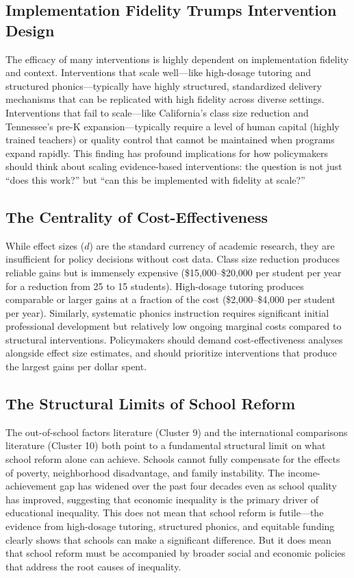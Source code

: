 \documentclass[12pt,letterpaper]{article}
\begin{document}
\subsection{Implementation Fidelity Trumps Intervention Design}

The efficacy of many interventions is highly dependent on implementation fidelity and context. Interventions that scale well---like high-dosage tutoring and structured phonics---typically have highly structured, standardized delivery mechanisms that can be replicated with high fidelity across diverse settings. Interventions that fail to scale---like California's class size reduction and Tennessee's pre-K expansion---typically require a level of human capital (highly trained teachers) or quality control that cannot be maintained when programs expand rapidly. This finding has profound implications for how policymakers should think about scaling evidence-based interventions: the question is not just ``does this work?'' but ``can this be implemented with fidelity at scale?''

\subsection{The Centrality of Cost-Effectiveness}

While effect sizes ($d$) are the standard currency of academic research, they are insufficient for policy decisions without cost data. Class size reduction produces reliable gains but is immensely expensive (\$15,000--\$20,000 per student per year for a reduction from 25 to 15 students). High-dosage tutoring produces comparable or larger gains at a fraction of the cost (\$2,000--\$4,000 per student per year). Similarly, systematic phonics instruction requires significant initial professional development but relatively low ongoing marginal costs compared to structural interventions. Policymakers should demand cost-effectiveness analyses alongside effect size estimates, and should prioritize interventions that produce the largest gains per dollar spent.

\subsection{The Structural Limits of School Reform}

The out-of-school factors literature (Cluster 9) and the international comparisons literature (Cluster 10) both point to a fundamental structural limit on what school reform alone can achieve. Schools cannot fully compensate for the effects of poverty, neighborhood disadvantage, and family instability. The income-achievement gap has widened over the past four decades even as school quality has improved, suggesting that economic inequality is the primary driver of educational inequality. This does not mean that school reform is futile---the evidence from high-dosage tutoring, structured phonics, and equitable funding clearly shows that schools can make a significant difference. But it does mean that school reform must be accompanied by broader social and economic policies that address the root causes of inequality.
\end{document}
